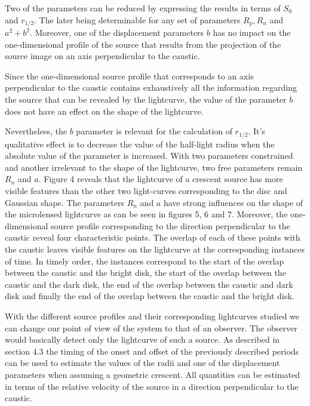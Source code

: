 \documentclass[usenatbib]{mn2e}
\begin{document}
Two of the parameters can be reduced by expressing the results in terms of $S_0$ and $r_{1/2}$. 
The later being determinable for any set of parameters $R_p, R_n$ and $a^2+b^2$. Moreover, one of the displacement 
parameters $b$ has no impact on the one-dimensional profile of the source that results from the projection of the source image on an axis perpendicular to the caustic. 

Since the one-dimensional source profile that corresponds to an axis perpendicular to the caustic contains exhaustively all the information regarding the source that can be revealed by the lightcurve, 
the value of the parameter $b$ does not have an effect on the shape of the lightcurve. 

Nevertheless, the $b$ parameter is relevant for the calculation of $r_{1/2}$. 
It's qualitative effect is to decrease the value of the half-light radius when the absolute value of the parameter is increased.  
With two parameters constrained and another irrelevant to the shape of the lightcurve, two free parameters remain $R_n$ and $a$. 
Figure 4 reveals that the lightcurve of a crescent source has more visible features than the other two light-curves 
corresponding to the disc and Gaussian shape. The parameters $R_n$ and $a$ have strong influences on the shape of 
the microlensed lightcurve as can be seen in figures 5, 6 and 7. Moreover, the one-dimensional source profile corresponding to the direction perpendicular to the caustic reveal four characteristic points. The overlap of each of these points with the caustic leaves visible features on the lightcurve at the corresponding instances of time. In timely order, the instances correspond to the start of the overlap between the caustic and the bright disk, the start of the overlap between the caustic and the dark disk, the end of the overlap between the caustic and dark disk and finally the end of the overlap between the caustic and the bright disk.          


With the different source profiles and their corresponding lightcurves studied we can change our point of view of the system to that of an observer. 
The observer would basically detect only the lightcurve of such a source. As described in section 4.3 the timing of the onset and offset of the previously 
described periods can be used to estimate the values of the radii and one of the displacement parameters when assuming a geometric crescent. 
All quantities can be estimated in terms of the relative velocity of the source in a direction perpendicular to the caustic.
\end{document}
